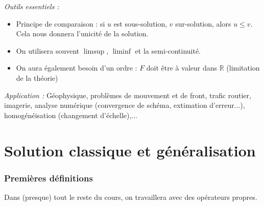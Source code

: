 \bigskip
\textit{Outils essentiels :}\begin{itemize}
	\item Principe de comparaison : si $u$ est sous-solution, $v$ sur-solution, alors $u\leq v$. Cela nous donnera l'unicité de la solution.
	\item On utilisera souvent $\limsup$, $\liminf$ et la semi-continuité.
	\item On aura également besoin d'un ordre : $F$ doit être à valeur dans $\mathbb{R}$ (limitation de la théorie)
\end{itemize}

\bigskip
\textit{Application :} Géophysique, problèmes de mouvement et de front, trafic routier, imagerie, analyse numérique (convergence de schéma, extimation d'erreur...), homogénéisation (changement d'échelle),...

\newpage
\part{Solution classique et généralisation}
\section{Premières définitions}

Dans (presque) tout le reste du cours, on travaillera avec des opérateurs propres.


